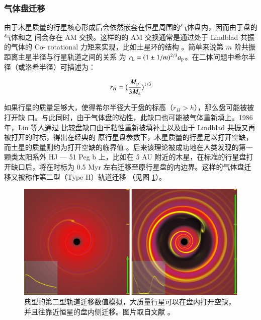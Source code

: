 \subsubsection{气体盘迁移} \label{sec:diskmig}

由于木星质量的行星核心形成后会依然嵌套在恒星周围的气体盘内，因而由于盘的气体和之
间会存在 AM 交换。这样的的 AM 交换通常是通过处于 Lindblad 共振的气体的 Co-
rotational 力矩来实现\cite{Binney1987,GoldreichTremaine1979}，比如土星环的结构
\cite{GoldreichTremaine1980}。简单来说第 $m$ 阶共振距离主星半径与行星轨道之间的关系
为 $r_\mathrm{L} = (1\pm 1/m)^{2/3} a_\mathrm{p}$。在二体问题中希尔半径（或洛希半径）可描述为：

\begin{equation} \label{eq:hillradius}
r_H = \big( \frac{M_\mathrm{p}}{3M_\mathrm{s}} \big) ^{1/3}
\end{equation} %

如果行星的质量足够大，使得希尔半径大于盘的标高（$r_H > h$），那么盘可能被被打开缺
口。与此同时，由于气体盘的粘性，此缺口也可能被气体重新填上。1986 年，Lin 等人通过
比较盘缺口由于粘性重新被填补上以及由于 Lindblad 共振又再被打开的时标，得出在经典的
原行星盘参数下，木星质量的行星足以打开空缺，而土星的质量则约为打开空缺的临界值
\cite{Lin1986,Ward1997}。后来该理论被成功地在人类发现的第一颗类太阳系外 HJ --- 51 Peg
 b 上\cite{Lin1996}，比如在 5 AU 附近的木星，在标准的行星盘打开缺口后，将在时标为 0.5 
 Myr 左右迁移至原行星盘的内边界。这样的气体盘迁移又被称作第二型（Type II）轨道迁移
 （见图 \ref{fig:diskmig}）。

\begin{figure}[t]
\centering
\includegraphics[width=1.0\textwidth]{figures/chapter4/fig3_diskmig.eps}
\caption[典型的第二型轨道迁移数值模拟，大质量行星可以在盘内打开空缺，并且往靠近恒星的盘内侧迁移。图片版权 Armitage\/Rice。]{典型的第二型轨道迁移数值模拟，大质量行星可以在盘内打开空缺，并且往靠近恒星的盘内侧迁移。图片取自文献 。}
\label{fig:diskmig}
\end{figure}


